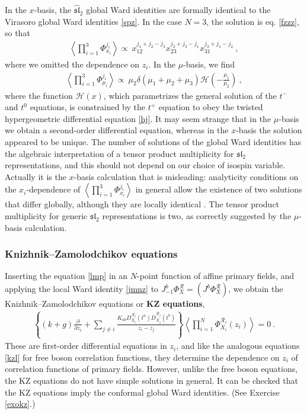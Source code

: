 \documentclass[12pt, a4paper, notitlepage, twoside]{report}
\numberwithin{equation}{section}
\theoremstyle{break}
\begin{document}
In the $x$-basis, the $\widehat{\mathfrak{sl}}_2$ global Ward identities are formally identical to the Virasoro global Ward identities \eqref{spz}. In the case $N=3$, the solution is eq. \eqref{fzzz}, so that 
\begin{align}
 \left\langle \prod_{i=1}^3 \Phi^{j_i}_{x_i} \right\rangle \propto\ x_{12}^{j_1+j_2-j_3} x_{23}^{j_2+j_3-j_1} x_{31}^{j_3+j_1-j_2}\ ,
\label{xxx}
\end{align}
where we omitted the dependence on $z_i$.
In the $\mu$-basis, we find 
\begin{align}
 \left\langle \prod_{i=1}^3\Phi^{j_i}_{\mu_i}\right\rangle \propto\ \mu_2\delta(\mu_1+\mu_2+\mu_3) \mathcal{H}\left(-\frac{\mu_1}{\mu_2}\right)\ ,
\label{pmf}
\end{align}
where the function $\mathcal{H}(x)$, which parametrizes the general solution of the $t^-$ and $t^0$ equations, is constrained by the $t^+$ equation to obey the twisted hypergeometric differential equation \eqref{hj}.
It may seem strange that in the $\mu$-basis we obtain a second-order differential equation, whereas in the $x$-basis the solution appeared to be unique.
The number of solutions of the global Ward identities has the algebraic interpretation of a tensor product multiplicity for $\mathfrak{sl}_2$ representations, and this should not depend on our choice of isospin variable.
Actually it is the $x$-basis calculation that is misleading: analyticity conditions on the $x_i$-dependence of $\left\langle \prod_{i=1}^3 \Phi^{j_i}_{x_i} \right\rangle$ in general allow the existence of two solutions that differ globally, although they are locally identical \cite{rib09}.
The tensor product multiplicity for generic $\mathfrak{sl}_2$ representations is two, as correctly suggested by the $\mu$-basis calculation. 

\subsubsection{Knizhnik--Zamolodchikov equations}

Inserting the equation \eqref{lmp} in an $N$-point function of affine primary fields, and applying the local Ward identity \eqref{jmnz} to $J^b_{-1}\Phi^\mathcal{R}_X = (J^b\Phi^\mathcal{R}_X)$, we obtain the Knizhnik--Zamolodchikov equations or \textbf{\boldmath KZ equations},
\begin{align}
 \boxed{\left\{(k+g){\frac{\partial}{\partial z_i}} + \sum_{j\neq i} \frac{K_{ab}D_{X_i}^{\mathcal{R}_i}(t^a)D_{X_j}^{\mathcal{R}_j}(t^b)}{z_i-z_j}\right\}\left\langle \prod_{i=1}^N \Phi^{\mathcal{R}_i}_{X_i}(z_i)\right\rangle  = 0}\ .
\label{kz} 
\end{align}
These are first-order differential equations in $z_i$, and like the analogous equations \eqref{kzl} for free boson correlation functions, they determine the dependence on $z_i$ of correlation functions of primary fields.
However, unlike the free boson equations, the KZ equations do not have simple solutions in general. 
It can be checked that the KZ equations imply the conformal global Ward identities. (See Exercise \ref{exokz}.)
\end{document}
